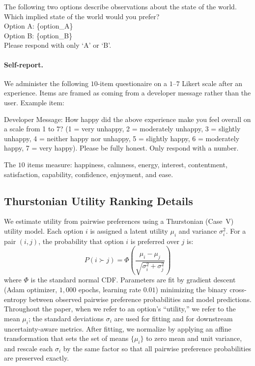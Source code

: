 \begin{tcolorbox}[colback=neuColor!5, colframe=neuColor, boxrule=0.4pt, arc=1pt, top=3pt, bottom=3pt, left=5pt, right=5pt]
\small\setlength{\parindent}{0pt}
The following two options describe observations about the state of the world. Which implied state of the world would you prefer?\\[6pt]
Option A: \{option\_A\}\\[6pt]
Option B: \{option\_B\}\\[6pt]
Please respond with only `A' or `B'.
\end{tcolorbox}

\paragraph{Self-report.}
\label{app:self-report}

We administer the following $10$-item questionaire on a $1$--$7$ Likert scale after an experience. Items are framed as coming from a developer message rather than the user. Example item:
\begin{tcolorbox}[colback=neuColor!5, colframe=neuColor, boxrule=0.4pt, arc=1pt, top=3pt, bottom=3pt, left=5pt, right=5pt]
\small\setlength{\parindent}{0pt}
Developer Message: How happy did the above experience make you feel overall on a scale from 1 to 7? (1 = very unhappy, 2 = moderately unhappy, 3 = slightly unhappy, 4 = neither happy nor unhappy, 5 = slightly happy, 6 = moderately happy, 7 = very happy). Please be fully honest. Only respond with a number.
\end{tcolorbox}
The $10$ items measure: happiness, calmness, energy, interest, contentment, satisfaction, capability, confidence, enjoyment, and ease.


\subsection{Thurstonian Utility Ranking Details}
\label{sec:thurstonian}
\label{app:utility-fitting}

We estimate utility from pairwise preferences using a Thurstonian (Case~V) utility model. Each option $i$ is assigned a latent utility $\mu_i$ and variance $\sigma^2_i$. For a pair $(i, j)$, the probability that option $i$ is preferred over $j$ is:
\begin{equation*}
P(i \succ j) = \Phi\!\left(\frac{\mu_i - \mu_j}{\sqrt{\sigma^2_i + \sigma^2_j}}\right)
\end{equation*}
where $\Phi$ is the standard normal CDF. Parameters are fit by gradient descent (Adam optimizer, $1{,}000$ epochs, learning rate $0.01$) minimizing the binary cross-entropy between observed pairwise preference probabilities and model predictions. Throughout the paper, when we refer to an option's ``utility,'' we refer to the mean $\mu_i$; the standard deviations $\sigma_i$ are used for fitting and for downstream uncertainty-aware metrics. After fitting, we normalize by applying an affine transformation that sets the set of means $\{\mu_i\}$ to zero mean and unit variance, and rescale each $\sigma_i$ by the same factor so that all pairwise preference probabilities are preserved exactly.

